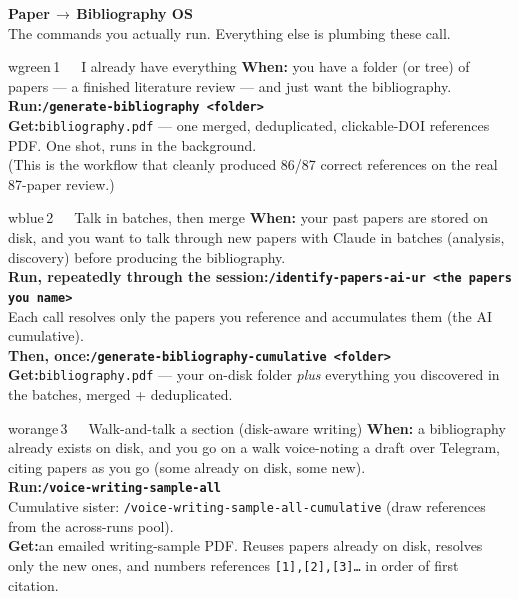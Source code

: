 \documentclass[11pt]{article}
\newcommand{\cmd}[1]{\colorbox{wlightgrey}{\texttt{\textbf{#1}}}}
\begin{document}
{\Huge\bfseries Paper\,$\to$\,Bibliography OS}\\[2pt]
{\large\color{wgrey} The commands you actually run. Everything else is plumbing these call.}\\[10pt]

\begin{flow}{wgreen}{\,1\ \ \ I already have everything}
\textbf{When:} you have a folder (or tree) of papers — a finished literature review — and just want the bibliography.\\[4pt]
\textbf{Run:}\quad \cmd{/generate-bibliography <folder>}\\[4pt]
\textbf{Get:}\quad \texttt{bibliography.pdf} — one merged, deduplicated, clickable-DOI references PDF. One shot, runs in the background.\\[2pt]
{\small\color{wgrey}(This is the workflow that cleanly produced 86/87 correct references on the real 87-paper review.)}
\end{flow}

\vspace{8pt}

\begin{flow}{wblue}{\,2\ \ \ Talk in batches, then merge}
\textbf{When:} your past papers are stored on disk, and you want to talk through new papers with Claude in batches (analysis, discovery) before producing the bibliography.\\[4pt]
\textbf{Run, repeatedly through the session:}\quad \cmd{/identify-papers-ai-ur <the papers you name>}\\
{\small\color{wgrey}\hspace*{1em}Each call resolves only the papers you reference and accumulates them (the AI cumulative).}\\[4pt]
\textbf{Then, once:}\quad \cmd{/generate-bibliography-cumulative <folder>}\\[4pt]
\textbf{Get:}\quad \texttt{bibliography.pdf} — your on-disk folder \emph{plus} everything you discovered in the batches, merged + deduplicated.
\end{flow}

\vspace{8pt}

\begin{flow}{worange}{\,3\ \ \ Walk-and-talk a section (disk-aware writing)}
\textbf{When:} a bibliography already exists on disk, and you go on a walk voice-noting a draft over Telegram, citing papers as you go (some already on disk, some new).\\[4pt]
\textbf{Run:}\quad \cmd{/voice-writing-sample-all}\\
{\small\color{wgrey}\hspace*{1em}Cumulative sister: \texttt{/voice-writing-sample-all-cumulative} (draw references from the across-runs pool).}\\[4pt]
\textbf{Get:}\quad an emailed writing-sample PDF. Reuses papers already on disk, resolves only the new ones, and numbers references \texttt{[1],[2],[3]\ldots} in order of first citation.
\end{flow}
\end{document}
